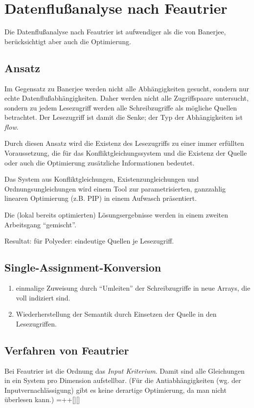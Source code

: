 
\section{Datenflußanalyse nach Feautrier \cite{Fea91}}
Die Datenflußanalyse nach Feautrier \cite{Fea91} ist aufwendiger als die von Banerjee, berücksichtigt aber auch die Optimierung.


\subsection{Ansatz}
Im Gegensatz zu Banerjee werden nicht alle Abhängigkeiten gesucht,
sondern nur echte Datenflußabhängigkeiten. Daher werden nicht alle
Zugriffspaare untersucht, sondern zu jedem Lesezugriff werden alle
Schreibzugriffe als mögliche Quellen betrachtet. Der Lesezugriff ist
damit die Senke; der Typ der Abhängigkeiten ist \emph{flow}.

Durch diesen Ansatz wird die Existenz des Lesezugriffs zu einer immer
erfüllten Voraussetzung, die für das Konfliktgleichungssystem und die
Existenz der Quelle oder auch die Optimierung zusätzliche Informationen
bedeutet.

Das System aus Konfliktgleichungen, Existenzungleichungen und
Ordnungsungleichungen wird einem Tool zur parametrisierten, ganzzahlig
linearen Optimierung (z.B. PIP) in einem Aufwasch präsentiert.

Die (lokal bereits optimierten) Lösungsergebnisse werden in einem
zweiten Arbeitsgang ``gemischt''.

Resultat: für Polyeder: eindeutige Quellen je Lesezugriff.


\subsection{Single-Assignment-Konversion}
\begin{enumerate}
\item einmalige Zuweisung durch ``Umleiten'' der Schreibzugriffe in
  neue Arrays, die voll indiziert sind.
\item Wiederherstellung der Semantik durch Einsetzen der Quelle in den
  Lesezugriffen.
\end{enumerate}


\subsection{Verfahren von Feautrier}
Bei Feautrier ist die Ordnung das \emph{Input Kriterium}. Damit sind alle Gleichungen in ein System pro Dimension aufstellbar. (Für die Antiabhängigkeiten (wg. der Inputvernachlässigung) gibt es keine derartige Optimierung, da man nicht überlesen kann.)
\entrymodifiers={++[][]}

